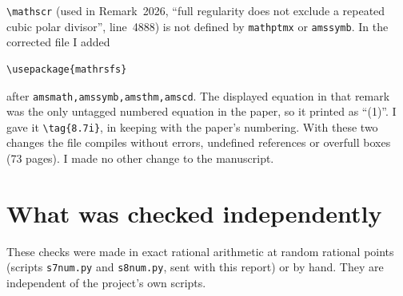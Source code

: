 \documentclass[12pt,letterpaper]{amsart}
\begin{document}
\texttt{\textbackslash mathscr} (used in Remark~2026, ``full regularity does not
exclude a repeated cubic polar divisor'', line~4888) is not defined by
\texttt{mathptmx} or \texttt{amssymb}. In the corrected file I added
\begin{verbatim}
\usepackage{mathrsfs}
\end{verbatim}
after \texttt{amsmath,amssymb,amsthm,amscd}. The displayed equation in that
remark was the only untagged numbered equation in the paper, so it printed as
``(1)''. I gave it \texttt{\textbackslash tag\{8.7i\}}, in keeping with the
paper's numbering. With these two changes the file compiles without errors,
undefined references or overfull boxes (73 pages). I made no other change to
the manuscript.

\section{What was checked independently}

These checks were made in exact rational arithmetic at random rational
points (scripts \texttt{s7num.py} and \texttt{s8num.py}, sent with this
report) or by hand. They are independent of the project's own scripts.
\end{document}
